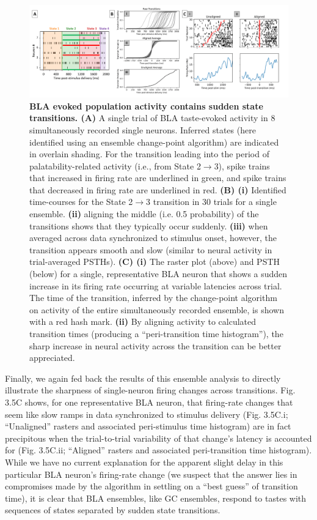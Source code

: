 \begin{refsection}
\begin{figure}
\includegraphics[width=\linewidth]{mahmood_22_figures/fig5_corrected_rescaled.png}
\caption{\textbf{BLA evoked population activity contains sudden state transitions. (A)} A single trial of BLA taste-evoked activity in 8 simultaneously recorded single neurons. Inferred states (here identified using an ensemble change-point algorithm) are indicated in overlain shading. For the transition leading into the period of palatability-related activity (i.e., from State 2$\rightarrow$3), spike trains that increased in firing rate are underlined in green, and spike trains that decreased in firing rate are underlined in red. \textbf{(B) (i)} Identified time-courses for the State 2$\rightarrow$3 transition in 30 trials for a single ensemble. \textbf{(ii)} aligning the middle (i.e. 0.5 probability) of the transitions shows that they typically occur suddenly. \textbf{(iii)} when averaged across data synchronized to stimulus onset, however, the transition appears smooth and slow (similar to neural activity in trial-averaged PSTHs). \textbf{(C) (i)} The raster plot (above) and PSTH (below) for a single, representative BLA neuron that shows a sudden increase in its firing rate occurring at variable latencies across trial. The time of the transition, inferred by the change-point algorithm on activity of the entire simultaneously recorded ensemble, is shown with a red hash mark. \textbf{(ii)} By aligning activity to calculated transition times (producing a “peri-transition time histogram”), the sharp increase in neural activity across the transition can be better appreciated.}
\label{fig:wrapfig}
\end{figure}

Finally, we again fed back the results of this ensemble analysis to directly illustrate the sharpness of single-neuron firing changes across transitions. Fig. 3.5C shows, for one representative BLA neuron, that firing-rate changes that seem like slow ramps in data synchronized to stimulus delivery (Fig. 3.5C.i; “Unaligned” rasters and associated peri-stimulus time histogram) are in fact precipitous when the trial-to-trial variability of that change’s latency is accounted for (Fig. 3.5C.ii; “Aligned” rasters and associated peri-transition time histogram). While we have no current explanation for the apparent slight delay in this particular BLA neuron’s firing-rate change (we suspect that the answer lies in compromises made by the algorithm in settling on a “best guess” of transition time), it is clear that BLA ensembles, like GC ensembles, respond to tastes with sequences of states separated by sudden state transitions.


\end{refsection}
